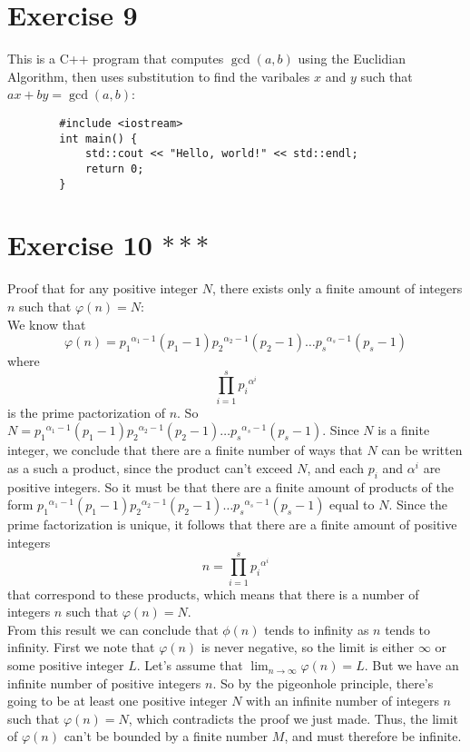 \documentclass[12pt]{article}
\begin{document}
    \section*{Exercise 9}
    This is a C++ program that computes $\gcd(a, b)$
    using the Euclidian Algorithm,
    then uses substitution to find the varibales $x$ and $y$
    such that $ax + by = \gcd(a, b)$: \\
    \begin{lstlisting}
        #include <iostream>
        int main() {
            std::cout << "Hello, world!" << std::endl;
            return 0;
        }
    \end{lstlisting}

    \section*{Exercise 10 $***$}
    Proof that for any positive integer $N$,
    there exists only a finite amount of integers $n$
    such that $\varphi(n) = N$: \\
    We know that 
    \[ \varphi(n)
    = {p_1}^{\alpha_1 - 1}(p_1 - 1){p_2}^{\alpha_2 - 1}(p_2 - 1)
    \dots {p_s}^{\alpha_s - 1}(p_s - 1) \]
    where 
    \[ \prod_{i=1}^s {p_i}^{\alpha^i} \]
    is the prime pactorization of $n$.
    So $N = {p_1}^{\alpha_1 - 1}(p_1 - 1){p_2}^{\alpha_2 - 1}(p_2 - 1)
    \dots {p_s}^{\alpha_s - 1}(p_s - 1)$.
    Since $N$ is a finite integer,
    we conclude that there are a finite number of ways that
    $N$ can be written as 
    a such a product,
    since the product can't exceed $N$,
    and each $p_i$ and $\alpha^i$ are positive integers.
    So it must be that there are a
    finite amount of products
    of the form ${p_1}^{\alpha_1 - 1}(p_1 - 1){p_2}^{\alpha_2 - 1}(p_2 - 1)
    \dots {p_s}^{\alpha_s - 1}(p_s - 1)$
    equal to $N$.
    Since the prime factorization is unique,
    it follows that there are a finite amount of positive integers
    \[ n  = \prod_{i=1}^s {p_i}^{\alpha^i} \]
    that correspond to these products,
    which means that there is a number of integers $n$
    such that $\varphi(n) = N$. \\
    From this result we can conclude
    that $\phi(n)$ tends to infinity
    as $n$ tends to infinity.
    First we note that $\varphi(n)$ is never negative,
    so the limit is either $\infty$ or some positive integer $L$.
    Let's assume that $\lim_{n \to \infty} \varphi(n) = L$.
    But we have an infinite number of positive integers $n$.
    So by the pigeonhole principle,
    there's going to be at least one positive integer $N$
    with an infinite number of integers $n$
    such that $\varphi(n) = N$,
    which contradicts the proof we just made.
    Thus, the limit of $\varphi(n)$
    can't be bounded by a finite number $M$,
    and must therefore be infinite. \\
\end{document}
